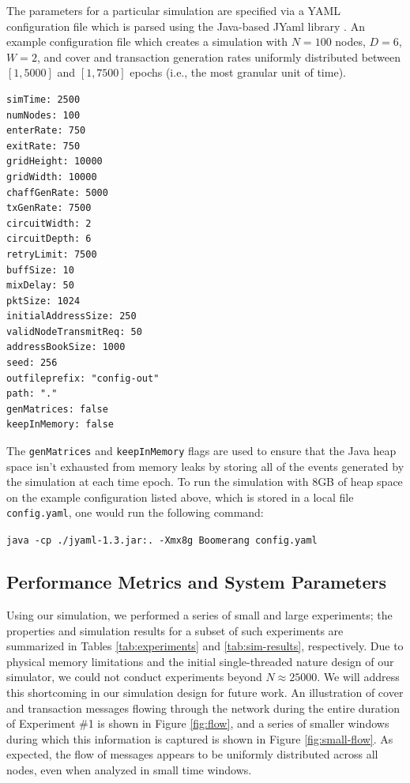 The parameters for a particular simulation are specified via a YAML configuration file which is parsed using the Java-based JYaml library \cite{jyaml}. An example configuration file which creates a simulation with $N = 100$ nodes, $D = 6$, $W = 2$, and cover and transaction generation rates uniformly distributed between $[1, 5000]$ and $[1, 7500]$ epochs (i.e., the most granular unit of time).

\begin{lstlisting}
simTime: 2500
numNodes: 100
enterRate: 750
exitRate: 750
gridHeight: 10000
gridWidth: 10000
chaffGenRate: 5000
txGenRate: 7500
circuitWidth: 2
circuitDepth: 6
retryLimit: 7500
buffSize: 10
mixDelay: 50
pktSize: 1024
initialAddressSize: 250
validNodeTransmitReq: 50
addressBookSize: 1000
seed: 256
outfileprefix: "config-out"
path: "."
genMatrices: false
keepInMemory: false
\end{lstlisting}

The {\tt genMatrices} and {\tt keepInMemory} flags are used to ensure that the Java heap space isn't exhausted from memory leaks by storing all of the events generated by the simulation at each time epoch. To run the simulation with 8GB of heap space on the example configuration listed above, which is stored in a local file {\tt config.yaml}, one would run the following command:

\begin{center}
{\small \tt java -cp ./jyaml-1.3.jar:. -Xmx8g Boomerang config.yaml}
\end{center}

\subsection{Performance Metrics and System Parameters}
Using our simulation, we performed a series of small and large experiments; the properties and simulation results for a subset of such experiments are summarized in Tables \ref{tab:experiments} and \ref{tab:sim-results}, respectively. Due to physical memory limitations and the initial single-threaded nature design of our simulator, we could not conduct experiments beyond $N \approx 25000$. We will address this shortcoming in our simulation design for future work. An illustration of cover and transaction messages flowing through the network during the entire duration of Experiment \#1 is shown in Figure \ref{fig:flow}, and a series of smaller windows during which this information is captured is shown in Figure \ref{fig:small-flow}. As expected, the flow of messages appears to be uniformly distributed across all nodes, even when analyzed in small time windows. 

